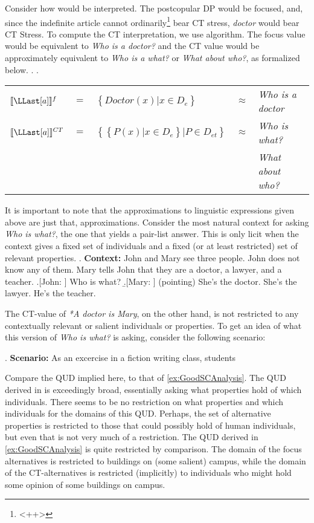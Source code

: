 \documentclass[GPFinal]{subfiles}
\begin{document}
Consider how \Last[a] would be interpreted.
The postcopular DP would be focused, and, since the indefinite article cannot ordinarily\footnote{<++>} bear CT stress, \textit{doctor} would bear CT Stress.
To compute the CT interpretation, we use  algorithm.
The focus value would be equivalent to \textit{Who is a doctor?} and the CT value would be approximately equivalent to \textit{Who is a what?} or \textit{What about who?}, as formalized below.
\ex.\label{ex:BadSCAnalysis}
	\a.
	\begin{tabular}[t]{lclcl}
	  $\llbracket\LLast[a]\rrbracket^f$&$=$&$\left\{ Doctor(x) | x \in D_e \right\}$&$\approx$&\textit{Who is a doctor}\\
	  $\llbracket\LLast[a]\rrbracket^{CT}$&$=$&$\left\{ \left\{ P(x) | x \in D_e \right\} | P \in D_{et} \right\}$&$\approx$&\textit{Who is what?}\\
	  {}&{}&{}&{}&\textit{What about who?}
	\end{tabular}

It is important to note that the approximations to linguistic expressions given above are just that, approximations.
Consider the most natural context for asking \textit{Who is what?}, the one that yields a pair-list answer.
This is only licit when the context gives a fixed set of individuals and a fixed (or at least restricted) set of relevant properties.
\ex. \textbf{Context:} John and Mary see three people. John does not know any of them. Mary tells John that they are a doctor, a lawyer, and a teacher.
\a.[John: ] Who is what?
\b.[Mary: ] (pointing) She's the doctor. She's the lawyer. He's the teacher.

The CT-value of \textit{*A doctor is Mary}, on the other hand, is not restricted to any contextually relevant or salient individuals or properties.
To get an idea of what this version of \textit{Who is what?} is asking, consider the following scenario:

\ex. \textbf{Scenario:} As an excercise in a fiction writing class, students

Compare the QUD implied here, to that of \ref{ex:GoodSCAnalysis}.
The QUD derived in \Last is exceedingly broad, essentially asking what properties hold of which individuals.
There seems to be no restriction on what properties and which individuals for the domains of this QUD.
Perhaps, the set of alternative properties is restricted to those that could possibly hold of human individuals, but even that is not very much of a restriction.
The QUD derived in \ref{ex:GoodSCAnalysis} is quite restricted by comparison.
The domain of the focus alternatives is restricted to buildings on (some salient) campus, while the domain of the CT-alternatives is restricted (implicitly) to individuals who might hold some opinion of some buildings on campus.
\end{document}
